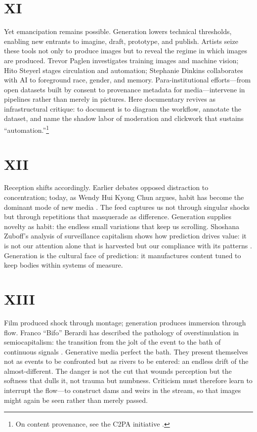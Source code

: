 \documentclass[12pt]{article}
\begin{document}
\section*{XI}

Yet emancipation remains possible. Generation lowers technical thresholds, enabling new entrants to imagine, draft, prototype, and publish. Artists seize these tools not only to produce images but to reveal the regime in which images are produced. Trevor Paglen investigates training images and machine vision; Hito Steyerl stages circulation and automation; Stephanie Dinkins collaborates with AI to foreground race, gender, and memory. Para-institutional efforts---from open datasets built by consent to provenance metadata for media---intervene in pipelines rather than merely in pictures. Here documentary revives as infrastructural critique: to document is to diagram the workflow, annotate the dataset, and name the shadow labor of moderation and clickwork that sustains ``automation.''\footnote{On content provenance, see the C2PA initiative \autocite{C2PA2023}.}

\section*{XII}

Reception shifts accordingly. Earlier debates opposed distraction to concentration; today, as Wendy Hui Kyong Chun argues, habit has become the dominant mode of new media \autocite{Chun2016}. The feed captures us not through singular shocks but through repetitions that masquerade as difference. Generation supplies novelty as habit: the endless small variations that keep us scrolling. Shoshana Zuboff's analysis of surveillance capitalism shows how prediction drives value: it is not our attention alone that is harvested but our compliance with its patterns \autocite{Zuboff2019}. Generation is the cultural face of prediction: it manufactures content tuned to keep bodies within systems of measure.

\section*{XIII}

Film produced shock through montage; generation produces immersion through flow. Franco ``Bifo'' Berardi has described the pathology of overstimulation in semiocapitalism: the transition from the jolt of the event to the bath of continuous signals \autocite{Berardi2012}. Generative media perfect the bath. They present themselves not as events to be confronted but as rivers to be entered: an endless drift of the almost-different. The danger is not the cut that wounds perception but the softness that dulls it, not trauma but numbness. Criticism must therefore learn to interrupt the flow---to construct dams and weirs in the stream, so that images might again be seen rather than merely passed.
\end{document}
